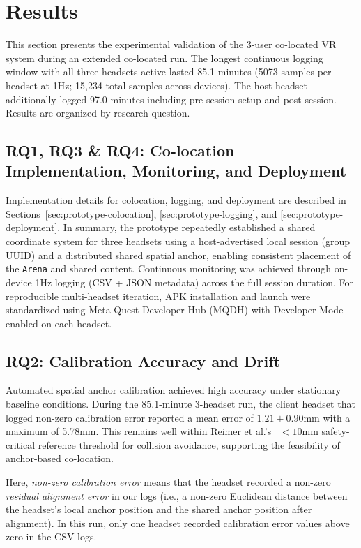 \section{Results}

This section presents the experimental validation of the 3-user co-located VR system during an extended co-located run. The longest continuous logging window with all three headsets active lasted 85.1 minutes (5073 samples per headset at 1Hz; 15,234 total samples across devices). The host headset additionally logged 97.0 minutes including pre-session setup and post-session. Results are organized by research question.

\subsection{RQ1, RQ3 \& RQ4: Co-location Implementation, Monitoring, and Deployment}

Implementation details for colocation, logging, and deployment are described in Sections~\ref{sec:prototype-colocation}, \ref{sec:prototype-logging}, and \ref{sec:prototype-deployment}. In summary, the prototype repeatedly established a shared coordinate system for three headsets using a host-advertised local session (group UUID) and a distributed shared spatial anchor, enabling consistent placement of the \texttt{Arena} and shared content. Continuous monitoring was achieved through on-device 1Hz logging (CSV + JSON metadata) across the full session duration. For reproducible multi-headset iteration, APK installation and launch were standardized using Meta Quest Developer Hub (MQDH) with Developer Mode enabled on each headset.

\subsection{RQ2: Calibration Accuracy and Drift}

Automated spatial anchor calibration achieved high accuracy under stationary baseline conditions. During the 85.1-minute 3-headset run, the client headset that logged non-zero calibration error reported a mean error of $1.21 \pm 0.90$mm with a maximum of 5.78mm. This remains well within Reimer et al.'s~\cite{ReimerDennis2021CfSV} $<10$mm safety-critical reference threshold for collision avoidance, supporting the feasibility of anchor-based co-location.

Here, \emph{non-zero calibration error} means that the headset recorded a non-zero \emph{residual alignment error} in our logs (i.e., a non-zero Euclidean distance between the headset's local anchor position and the shared anchor position after alignment). In this run, only one headset recorded calibration error values above zero in the CSV logs.

